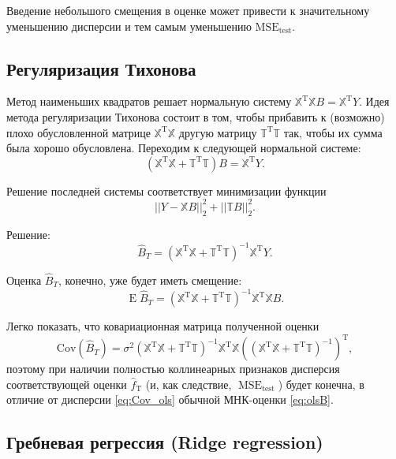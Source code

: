 \documentclass[11pt,colorlinks=true]{article}
\DeclareMathOperator{\T}{T}
\DeclareMathOperator{\MSE}{MSE}
\DeclareMathOperator{\E}{E}
\begin{document}
Введение небольшого смещения в оценке может привести к значительному уменьшению дисперсии и тем самым уменьшению $\mathrm{MSE}_{\text{test}}$.


\subsection{Регуляризация Тихонова}

Метод наименьших квадратов решает нормальную систему $\mathbb{X}^{\T}\mathbb{X}B=\mathbb{X}^{\T}Y$.
Идея метода регуляризации Тихонова состоит в том, чтобы прибавить к (возможно) плохо обусловленной матрице $\mathbb{X}^{\T}\mathbb{X}$ другую матрицу  $\mathbb{T}^{\T}\mathbb{T}$ так, чтобы их сумма была хорошо обусловлена. Переходим к следующей нормальной системе: 
\begin{equation*}
(\mathbb{X}^{\T}\mathbb{X}+\mathbb{T}^{\T}\mathbb{T})B=\mathbb{X}^{\T}Y.
\end{equation*}

Решение последней системы соответствует минимизации функции 
\begin{equation*}
||Y-\mathbb{X}B||_{2}^{2}+||\mathbb{T}B||_{2}^{2}.
\end{equation*}

Решение: 
\begin{equation*}
\hat{B}_{T}
=(\mathbb{X}^{\T}\mathbb{X}+\mathbb{T}^{\T}\mathbb{T})^{-1}\mathbb{X}^{\T} Y.
\end{equation*}

Оценка $\hat{B}_{T}$, конечно, уже будет иметь смещение:
\begin{equation*}
\E\hat{B}_{T}
=
(\mathbb{X}^{\T}\mathbb{X}+\mathbb{T}^{\T}\mathbb{T})^{-1}\mathbb{X}^{\T}\mathbb{X}B.
\end{equation*}

Легко показать, что ковариационная матрица полученной оценки
\begin{equation*}
\mathrm{Cov}(\hat{B}_{T})
=
\sigma^{2}
(\mathbb{X}^{\T}\mathbb{X}+\mathbb{T}^{\T}\mathbb{T})^{-1}
\mathbb{X}^{\T}\mathbb{X}
((\mathbb{X}^{\T}\mathbb{X}+\mathbb{T}^{\T}\mathbb{T})^{-1})^{\T},
\end{equation*}
поэтому при наличии полностью коллинеарных признаков дисперсия соответствующей оценки $\hat{f}_{\T}$ (и, как следствие, $\MSE_{\text{test}}$) будет конечна, в отличие от дисперсии \eqref{eq:Cov_ols} обычной МНК-оценки \eqref{eq:olsB}.


\subsection{Гребневая регрессия (Ridge regression)}
\end{document}
